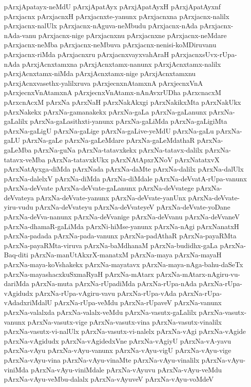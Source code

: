 {pArxjApatayx-neMdU
pArxjApatAyx
pArxjApatAyxH
pArxjApatAyxnf
pArxjacnx
pArxjacnxH
pArxjacnxte-yanunx
pArxjacnxna
pArxjacnx-nalilx
pArxjacnx-nalUlx
pArxjacnx-nAguva-neMbudu
pArxjacnx-nAda
pArxjacnx-nAda-vanu
pArxjacnx-nige
pArxjacnxnu
pArxjacnxne
pArxjacnx-neMdare
pArxjacnx-neMba
pArxjacnx-neMbuva
pArxjacnx-nenisi-koMDiruvanu
pArxjacnx-riMda
pArxjacnxru
pArxjacnxvayxvahAraH
pArxjacnxsUvx-rUpa-nAda
pArxjAcnxtamxna
pArxjAcnxtamx-nanunx
pArxjAcnxtamx-nalilx
pArxjAcnxtamx-niMda
pArxjAcnxtamx-nige
pArxjAcnxtamxnu
pArxjAcnxvasethx-yalilxruva
pArxjecnxnAtamxnA
pArxjecnxVnA
pArxjecnxVnAtamxnA
pArxjecnxVnAtamx-nAnAvxrUDha
pArxcnacxM
pArxcnAcxM
pArxNa
pArxNaH
pArxNakAkxgi
pArxNakikxMta
pArxNakUkx
pArxNakekx
pArxNa-gamanakekx
pArxNa-gaLa
pArxNa-gaLanunx
pArxNa-gaLalilx
pArxNa-gaLasithxti-yanunx
pArxNa-gaLiMda
pArxNa-gaLigiMta
pArxNa-gaLigU
pArxNa-gaLige
pArxNa-gaLive-yeMdU
pArxNa-gaLu
pArxNa-gaLU
pArxNa-gaLe
pArxNa-gaLeMdare
pArxNa-gaLeMdathaR
pArxNa-gaLeMba
pArxNa-guNa
pArxNa-tatavxkekx
pArxNa-tatavx-dalilx
pArxNa-tatavx-veMba
pArxNa-tatavxkUkx
pArxNAtApxrXNoV
pArxNatatxvX
pArxNatAyxga-diMda
pArxNada
pArxNa-daMte
pArxNa-dalilx
pArxNa-dalUlx
pArxNa-dalelxV
pArxNa-diMda
pArxNa-diMdale
pArxNa-deVvatA-rUpa-vanunx
pArxNa-deVvate
pArxNa-deVvate-gaLanunx
pArxNa-deVvatege
pArxNa-deVvateya
pArxNa-deVvate-yanunx
pArxNa-deVvate-yanUnx
pArxNa-deVvate-yiru-vudu
pArxNa-deVvateyu
pArxNa-deVvateyeV
pArxNa-deVvate-yoDane
pArxNa-deVva-nanunx
pArxNa-deVvanige
pArxNa-deVvanu
pArxNa-deVvaneV
pArxNa-dhamaR-gaLiMda
pArxNi-hiMse-yanunx
pArxNa-nAgi
pArxNanatxH
pArxNa-padada
pArxNa-pada-vanunx
pArxNa-padAthaR
pArxNa-payaRMta
pArxNa-payaRMta-viruva
pArxNa-baMdhanaM
pArxNa-budidhx-gaLa
pArxNa-Baq-diti
pArxNa-manUtAkxrX-manatxM
pArxNa-maya
pArxNa-mayaH
pArxNa-maya-koVshakekx
pArxNa-mayatavx
pArxNa-maya-nAga-bahu-daSeTx
pArxNa-mayashacxkuSxmaRyaH
pArxNa-mAtarx
pArxNa-mAtarx-nAgiru-vu-dariMda
pArxNa-muta
pArxNa-rUpadiMda
pArxNa-rUpa-nAda
pArxNa-rUpa-vAgidudx
pArxNa-rUpa-vAgiru-vavu
pArxNa-rUpa-vAda
pArxNa-rUpa-vAdadxriMdalU
pArxNa-rUpa-veMdu
pArxNa-rUpaveV
pArxNa-vanunx
pArxNa-valalxda
pArxNa-valalx-veMdu
pArxNa-vasutx-gaLalilx
pArxNa-vasutx-vanunx
pArxNa-vasutx-vige
pArxNa-vasutx-vina
pArxNa-vasutx-vinalilx
pArxNa-vasutx-vi-nalUlx
pArxNa-vasutx-vi-nalelx
pArxNa-vAgi
pArxNa-vAgide
pArxNa-vAgidudx
pArxNa-vAgidedxVne
pArxNa-vAgiyU
pArxNa-vA-yavu
pArxNa-vAyu
pArxNa-vAyu-vanunx
pArxNa-vAyu-vigU
pArxNa-vAyu-vige
pArxNa-vAyu-vina
pArxNa-vAyu-vinaMte
pArxNa-vAyu-vinalilx
pArxNa-vAyu-viniMda
pArxNa-vAyu-viniMdale
pArxNa-vAyuvu
pArxNa-vAyu-veMdu
pArxNa-vAyu-veMbu-dalalx
pArxNa-vAyuveV
pArxNa-vAyu-voMdeV
}
